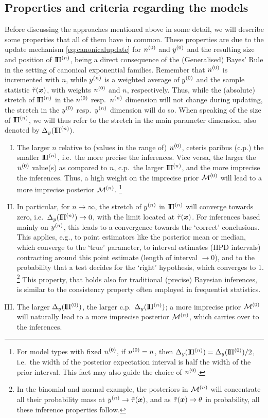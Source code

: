 \subsection{Properties and criteria regarding the models}
\label{sec:gbicp-properties-criteria}

Before discussing the approaches mentioned above in some detail,
we will describe some properties that all of them have in common.
These properties are due to the update mechanism \eqref{eq:canonicalupdate}
for $n^{(0)}$ and $y^{(0)}$ and the resulting size and position of $\text{I}\!\Pi^{(n)}$,
being a direct consequence of the (Generalised) Bayes' Rule in the setting of canonical exponential families.
Remember that $n^{(0)}$ is incremented with $n$, while $y^{(n)}$ is a weighted average of $y^{(0)}$ and the sample statistic $\tilde{\tau}({\bm x})$,
with weights $n^{(0)}$ and $n$, respectively.
Thus, while the (absolute) stretch of $\text{I}\!\Pi^{(n)}$ in the $n^{(0)}$ resp.\ $n^{(n)}$ dimension will not change during updating,
the stretch in the $y^{(0)}$ resp.\ $y^{(n)}$ dimension will do so.
When speaking of the size of $\text{I}\!\Pi^{(n)}$, we will thus refer to the stretch in the main parameter dimension, also denoted by $\Delta_y(\text{I}\!\Pi^{(n)})$.
\begin{enumerate}[I.]
\item The larger $n$ relative to (values in the range of) $n^{(0)}$,
ceteris paribus (c.p.) the smaller $\text{I}\!\Pi^{(n)}$, i.e.\ the more precise the inferences.
Vice versa, the larger the $n^{(0)}$ value(s) as compared to $n$, c.p.\ the larger $\text{I}\!\Pi^{(n)}$, and the more imprecise the inferences.
Thus, a high weight on the imprecise prior $\mathcal{M}^{(0)}$ will lead to a more imprecise posterior $\mathcal{M}^{(n)}$.%
\footnote{For model types with fixed $n^{(0)}$, if $n^{(0)} = n$, then $\Delta_y(\text{I}\!\Pi^{(n)}) = \Delta_y(\text{I}\!\Pi^{(0)}) / 2$,
i.e.\ the width of the posterior expectation interval is half the width of the prior interval.
This fact may also guide the choice of $n^{(0)}$.}
\item In particular, for $n \to \infty$, the stretch of $y^{(n)}$ in $\text{I}\!\Pi^{(n)}$ will converge towards zero,
i.e.\ $\Delta_y(\text{I}\!\Pi^{(n)}) \to 0$, with the limit located at $\tilde{\tau}({\bm x})$.
For inferences based mainly on $y^{(n)}$, this leads to a convergence towards the `correct' conclusions.
This applies, e.g., to point estimators like the posterior mean or median, which converge to the `true' parameter,
to interval estimates (HPD intervals) contracting around this point estimate (length of interval $\to 0$),
and to the probability that a test decides for the `right' hypothesis, which converges to 1.%
\footnote{In the binomial and normal example,
the posteriors in $\mathcal{M}^{(n)}$ will concentrate all their probability mass at $y^{(n)} \to \tilde{\tau}({\bm x})$,
and as $\tilde{\tau}({\bm x}) \to \theta$ in probability, all these inference properties follow.}
This property, that holds also for traditional (precise) Bayesian inferences,
is similar to the consistency property often employed in frequentist statistics.
\item The larger $\Delta_y(\text{I}\!\Pi^{(0)})$, the larger c.p.\ $\Delta_y(\text{I}\!\Pi^{(n)})$;
a more imprecise prior $\mathcal{M}^{(0)}$ will naturally lead to a more imprecise posterior $\mathcal{M}^{(n)}$, which carries over to the inferences.
\end{enumerate}

